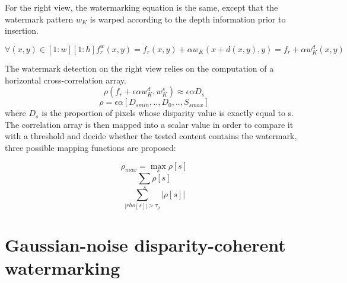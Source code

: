 For the right view, the watermarking equation is the same, except that the watermark pattern $w_{K}$ is warped according to the depth information prior to insertion.

$$\forall(x,y) \in [1:w][1:h] f_{r}^{w}(x,y) = f_{r}(x,y)+\alpha w_{K}(x+d(x,y),y) = f_{r}+\alpha w_{K}^{d}(x,y) $$

The watermark detection on the right view relies on the computation of a horizontal cross-correlation array.\newline
$$\rho (f_{r}+\epsilon\alpha w_{K}^{d},w_{K}^{s})\approx\epsilon\alpha D_{s} $$
$$ \rho = \epsilon\alpha [D_{smin},..,D_{0},..,S_{smax}]$$
where $D_{s}$ is the proportion of pixels whose disparity value is exactly equal to s.\newline
The correlation array is then mapped into a scalar value in order to compare it with a threshold and decide whether the tested content contains the watermark, three possible mapping functions are proposed:

$$\rho_{max}= \max_{s}\rho[s] $$
$$ \sum_{s}\rho[s] $$
$$ \sum_{|rho[s]|>\tau_{\rho}}|\rho[s]| $$

\section{ Gaussian-noise disparity-coherent watermarking} 

